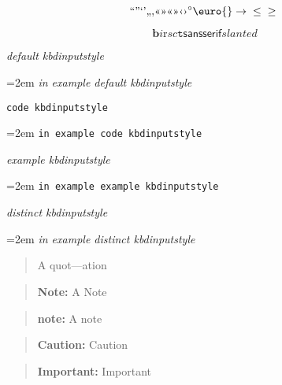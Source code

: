 \documentclass{book}
\begin{document}
\begin{titlepage}
$$
\mathord{\text{\textquotedblleft{}}} \mathord{\text{\textquotedblright{}}} 
\mathord{\text{\textquoteleft{}}} \mathord{\text{\textquoteright{}}} \mathord{\text{\quotedblbase{}}} \mathord{\text{\quotesinglbase{}}} \mathord{\text{\guillemotleft{}}}
\mathord{\text{\guillemotright{}}} \mathord{\text{\guillemotleft{}}} \mathord{\text{\guillemotright{}}} \mathord{\text{\guilsinglleft{}}}
\mathord{\text{\guilsinglright{}}} ^{\circ{}} \euro{} \rightarrow{} \leq{} \geq{}
$$

$$
\mathbf{b} \mathit{i} \mathrm{r} sc \mathtt{t} \mathsf{sansserif} slanted
$$

{\ttfamily\textsl{default kbdinputstyle}}
\par\begingroup\obeylines\obeyspaces\frenchspacing\leftskip=2em\relax\parskip=0pt\relax\ttfamily{}%
{\ttfamily\textsl{in example default kbdinputstyle}}
\endgroup{}%

\texttt{code kbdinputstyle}
\par\begingroup\obeylines\obeyspaces\frenchspacing\leftskip=2em\relax\parskip=0pt\relax\ttfamily{}%
\texttt{in example code kbdinputstyle}
\endgroup{}%

{\ttfamily\textsl{example kbdinputstyle}}
\par\begingroup\obeylines\obeyspaces\frenchspacing\leftskip=2em\relax\parskip=0pt\relax\ttfamily{}%
\texttt{in example example kbdinputstyle}
\endgroup{}%

{\ttfamily\textsl{distinct kbdinputstyle}}
\par\begingroup\obeylines\obeyspaces\frenchspacing\leftskip=2em\relax\parskip=0pt\relax\ttfamily{}%
{\ttfamily\textsl{in example distinct kbdinputstyle}}
\endgroup{}%

\begin{quote}
A quot---ation
\end{quote}

\begin{quote}
\textbf{Note:} A Note
\end{quote}

\begin{quote}
\textbf{note:} A note
\end{quote}

\begin{quote}
\textbf{Caution:} Caution
\end{quote}

\begin{quote}
\textbf{Important:} Important
\end{quote}


\end{titlepage}
\end{document}
